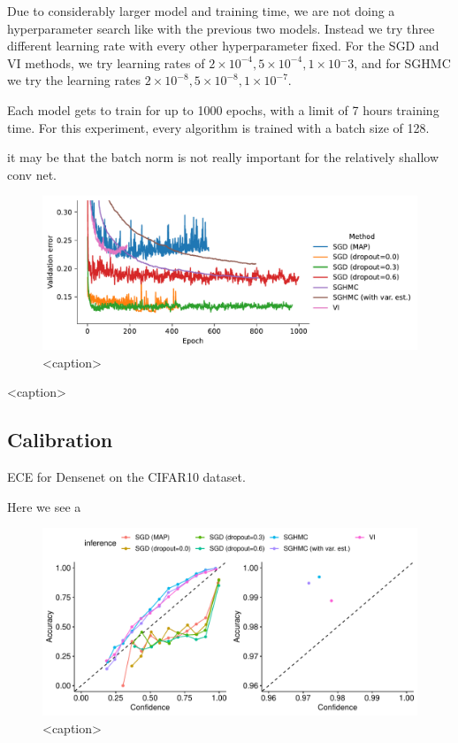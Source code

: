 Due to considerably larger model and training time, we are not doing a hyperparameter search like with the previous two models.
Instead we try three different learning rate with every other hyperparameter fixed.
For the SGD and VI methods, we try learning rates of $2\times 10^{-4},5\times 10^{-4},1\times 10{^-3}$, and for SGHMC we try the learning rates $2\times 10^{-8},5\times 10^{-8},1 \times 10^{-7}$.

Each model gets to train for up to 1000 epochs, with a limit of 7 hours training time.
For this experiment, every algorithm is trained with a batch size of 128.

it may be that the batch norm is not really important for the relatively shallow conv net.

\begin{figure}[htbp]
    \centering
    \includegraphics[width=\linewidth]{Figures/cifar-densenet-final-runs-val.pdf}
    \caption{<caption>}
    \label{<label>}
\end{figure}

\begin{table}[htbp]
    \centering
    
    \caption{<caption>}
    \label{<label>}
\end{table}

\subsection{Calibration}

\begin{table}[htbp]
    \centering
    
    \caption{ECE for Densenet on the CIFAR10 dataset.}
    \label{tab:cifar-densense-ece}
\end{table}
Here we see a 
\begin{figure}[htbp]
    \centering
    \includegraphics[width=\linewidth]{Figures/cifar10-densenet-calibration.pdf}
    \caption{<caption>}
    \label{<label>}
\end{figure}



